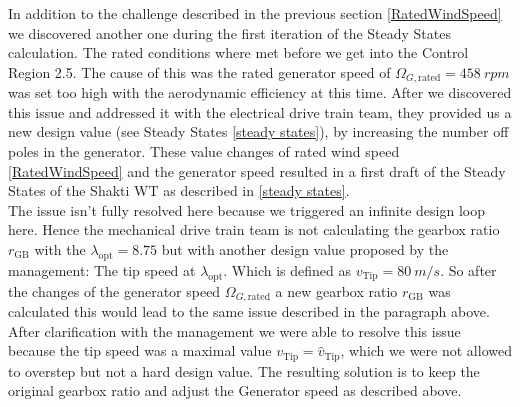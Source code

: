 In addition to the challenge described in the previous section \ref{RatedWindSpeed} we discovered another one during the first iteration of the Steady States calculation. The rated conditions where met before we get into the Control Region 2.5. The cause of this was the rated generator speed of $\Omega_{G,\text{rated}} = \SI{458}{rpm}$ was set too high with the aerodynamic efficiency at this time. After we discovered this issue and addressed it with the electrical drive train team, they provided us a new design value (see Steady States \ref{steady states}), by increasing the number off poles in the generator. These value changes of rated wind speed \ref{RatedWindSpeed} and the generator speed resulted in a first draft of the Steady States of the Shakti WT as described in \ref{steady states}.\\
The issue isn't fully resolved here because we triggered an infinite design loop here. Hence the mechanical drive train team is not calculating the gearbox ratio $r_{\text{GB}}$ with the $\lambda_{\text{opt}} = 8.75$ but with another design value proposed by the management: The tip speed at $\lambda_{\text{opt}}$. Which is defined as $v_{\text{Tip}} = \SI{80}{m/s}$. So after the changes of the generator speed $\Omega_{G,\text{rated}}$ a new gearbox ratio $r_{\text{GB}}$ was calculated this would lead to the same issue described in the paragraph above. After clarification with the management we were able to resolve this issue because the tip speed was a maximal value $v_{\text{Tip}} = \hat{v}_{\text{Tip}}$, which we were not allowed to overstep but not a hard design value. The resulting solution is to keep the original gearbox ratio and adjust the Generator speed as described above.      